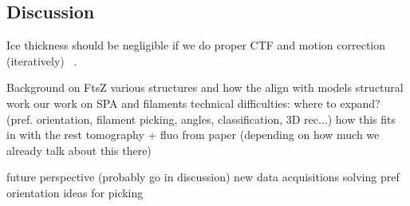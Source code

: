\subsection{Discussion}

Ice thickness should be negligible if we do proper CTF and motion correction (iteratively) ~\cite{aiyerOvercomingResolutionAttenuation2024}.

\begin{outline}
\1 Background on FtsZ
    \2 various structures and how the align with models
\1 structural work
    \2 our work on SPA and filaments
        \3 technical difficulties: where to expand? (pref. orientation, filament picking, angles, classification, 3D rec...)
    \2 how this fits in with the rest
    \2 tomography + fluo from paper (depending on how much we already talk about this there)

\1 future perspective (probably go in discussion)
    \2 new data acquisitions
    \2 solving pref orientation
    \2 ideas for picking
\end{outline}
